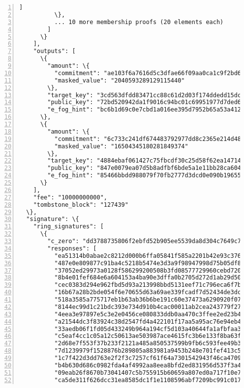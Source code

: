 \begin{appendices}
\begin{Verbatim}[commandchars=\\\{\}, numbers=left]
            ]
          \},
          ... 10 more membership proofs (20 elements each)
        ]
      \}
    ],
    "outputs": [
      \{
        "amount": \{
          "commitment": "ae103f6a7616d5c3dfae66f09aa0ca1c9f2bd6a[...]8871d41072f",
          "masked_value": "2040593289129115440"
        \},
        "target_key": "3cd563dfdd83471cc88c61d2d03f174ddedd15dc8[...]17d32d91663",
        "public_key": "72bd520942da1f9016c94bc01c69951977d7ded6b[...]ae8293ce077",
        "e_fog_hint": "bc6b1d69c0e7cbd1a016ee395d7952b65a53a412f[...]d58cfea0100"
      \},
      \{
        "amount": \{
          "commitment": "6c733c241df674483792977dd8c2365e214d488[...]a3efbb8e674",
          "masked_value": "16504345180281849374"
        \},
        "target_key": "4884ebaf061427c75fbcdf30c25d58f62ea14714d[...]4b6e35d926b",
        "public_key": "847e0079ea07d5b8adfbf6bde5a1e11bb28ca6043[...]137e6eb124d",
        "e_fog_hint": "85466bbdd988079f70fb2777d3dcd0e090b196552[...]13441540100"
      \}
    ],
    "fee": "10000000000",
    "tombstone_block": "127439"
  \},
  "signature": \{
    "ring_signatures": [
      \{
        "c_zero": "dd3788735806f2ebfd52b905ee5539da8d304c7649c774aa501e323e321cf50f",
        "responses": [
          "ea51314b0abae2c8212d000b6ffa05841f585a2201b42e93c37678034e0eba0b",
          "487e0e809877c91ba4c5218b5474e3d3a9f98947998d75b05df8fb9f5226f402",
          "37052ed29973a0128f586299200508b3fd08577729960cebd72026fd3941b807",
          "8b4e01fef684e6a604153a4ba90e3dffa0b2705d272d1ab29d50d6a4f30be602",
          "cec0383d294e962fbd5d93a213998bbd5131eef71c796eca6f7bf82b28aba20c",
          "16b67a28b2bde054f6e70655d63a69ae339fcadf7d52434de3dcdc2396ebba03",
          "518a3585a775717eb1b63ab36b6be191c60e37473a6290920f07583f4322ef08",
          "8144ec99d1c21bdc393e734d910b4cac00011ab2cea243779f27d019e2846d01",
          "4eea3e97897e5c3e2e0456ce080833ddb0aa470c3ffee2ed23b4db6e38eed905",
          "a21544dc3f83924c38d2547fd4a422101f17aa5a95ac76e94eb4ba2efbc88d02",
          "33aedb06f1fd05d433249b964a194cf5d103a40644fa1afbfaa31fb4b880180b",
          "c5eaf4cc1c05a12c50613ae503987ace4615fc3b6e133f8ba63f81d8d9822d03",
          "2d68e7f553f37b233f2121a485a850537599b9fb6c593fee49b339c98218660e",
          "7d1239979f1528876b289805a883981a9453b248e701fef413c59fef0fa73601",
          "1c7f422d3dd763e2f2f3c7257cf61f64a7301542943f46ca4709337d822e9b0a",
          "b4b630d686c0982fda4af4992aa8eea8bfd2ed831956d537f3a41bb15a33590f",
          "09eab26f8670b73041407c5b755915b60659a807ed0a717f10e779da292db802",
          "ca5de311f626dcc31ea8585dc1f1e1108596abf7209bc991c01723e22bb8b30c",

\end{Verbatim}
\end{appendices}
